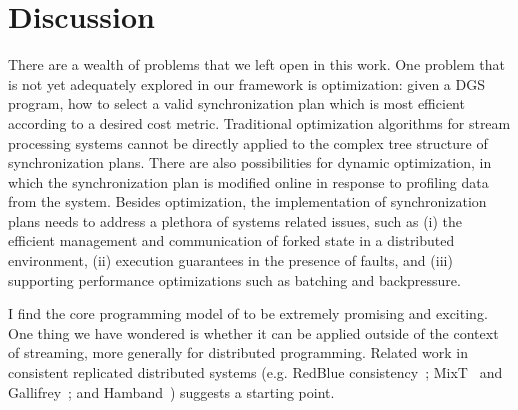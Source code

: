 \section{Discussion}
\label{dgs:sec:conclusion}

There are a wealth of problems that we left open in this work.
One problem that is not yet adequately explored in our framework is optimization:
given a DGS program, how to select a valid synchronization plan which is most efficient according to a desired cost metric.
Traditional optimization algorithms for stream processing systems cannot be directly applied to
the complex tree structure of synchronization plans.
There are also possibilities for
dynamic optimization, in which the synchronization plan is modified online in response to profiling data from the system.
Besides optimization, the implementation of synchronization plans needs to address a plethora of systems related issues, such as (i) the efficient management and communication of forked state in a distributed environment, (ii) execution guarantees in the presence of faults, and (iii) supporting performance optimizations such as batching and backpressure.

I find the core programming model of  to be extremely promising and exciting. One thing we have wondered is whether it can be applied outside of the context of streaming, more generally for distributed programming. Related work in consistent replicated distributed systems
(e.g. RedBlue consistency~\cite{li2012making};
MixT~\cite{milano2018mixt} and Gallifrey~\cite{milano2019tour};
and Hamband~\cite{houshmand2022hamband})
suggests a starting point.
